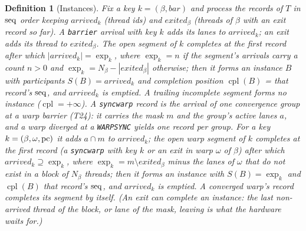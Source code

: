 \documentclass[11pt]{article}
\newtheorem{definition}[theorem]{Definition}
\theoremstyle{remark}
\DeclareMathOperator{\cpl}{cpl}\DeclareMathOperator{\Exec}{Exec}\DeclareMathOperator{\rf}{rf}
\newcommand{\arrv}{\mathit{arrived}}\newcommand{\gone}{\mathit{exited}}\newcommand{\Rep}{\mathit{Rep}}
\begin{document}
\begin{definition}[Instances]\label{def:instance}
Fix a key $k=(\beta,\mathit{bar})$ and process the records of $T$ in $\operatorname{seq}$ order keeping
$\arrv_k$ (thread ids) and $\gone_\beta$ (threads of $\beta$ with an exit record so far). A
\texttt{barrier} arrival with key $k$ adds its lanes to $\arrv_k$; an exit adds its thread to
$\gone_\beta$. The open \emph{segment} of $k$ \emph{completes} at the first record after
which $|\arrv_k|=\exp_k$, where $\exp_k=n$ if the segment's arrivals carry a count $n>0$
and $\exp_k=N_\beta-|\gone_\beta|$ otherwise; then it forms an \emph{instance} $B$ with
participants $S(B)=\arrv_k$ and completion position $\cpl(B)$ = that record's $\operatorname{seq}$, and
$\arrv_k$ is emptied. A trailing incomplete segment forms no instance ($\cpl=+\infty$). A
\texttt{syncwarp} record is the arrival of one convergence group at a \emph{warp barrier}
(T24): it carries the mask $m$ and the group's active lanes $a$, and a warp diverged at a
\texttt{WARPSYNC} yields one record per group. For a key $k=(\beta,\omega,\operatorname{pc})$ it adds
$a\cap m$ to $\arrv_k$; the open warp segment of $k$ completes at the first record (a
\texttt{syncwarp} with key $k$ or an exit in warp $\omega$ of $\beta$) after which
$\arrv_k\supseteq\exp_k$, where $\exp_k=m\setminus\gone_\beta$ minus the lanes of $\omega$ that
do not exist in a block of $N_\beta$ threads; then it forms an instance with $S(B)=\exp_k$ and
$\cpl(B)$ that record's $\operatorname{seq}$, and $\arrv_k$ is emptied. A converged warp's record completes
its segment by itself. (An exit can complete an instance: the last non-arrived thread of the
block, or lane of the mask, leaving is what the hardware waits for.)
\end{definition}
\end{document}
